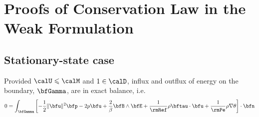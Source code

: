\chapter{Proofs of Conservation Law in the Weak Formulation}\label{cha:weak conservation proofs}
    \section*{Stationary-state case}
        \begin{theorem*}
            Provided $\calU  \leqslant  \calM$ and $1  \in  \calD$, influx and outflux  of energy on the boundary, $\bfGamma$, are in exact balance, i.e.
            \begin{equation}
                0  =  \int_{\bfGamma}\left[- \frac{1}{2}\|\bfu\|^{2}\bfp - 2p\bfu + \frac{2}{\beta}\bfB\wedge\bfE + \frac{1}{\rmRef}\rho\bftau\cdot\bfu + \frac{1}{\rmPe}\rho\nabla\theta\right]\cdot\bfn
            \end{equation}
        \end{theorem*}
